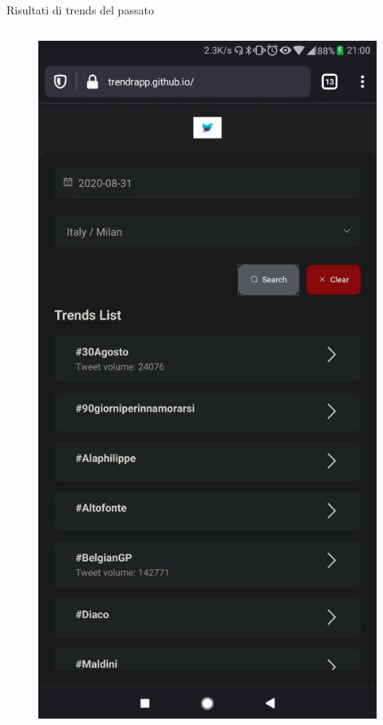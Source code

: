 \documentclass[xcolor=svgnames, aspectratio=169]{beamer}
\begin{document}
\begin{frame}{Risultati di trends del passato}
\begin{columns}[t]
\begin{figure}[H]
            \includegraphics[width=0.32\paperwidth,height=0.7\paperheight,keepaspectratio]{Mobile_Firefox_Ricerca_trends_a_Milano_31_agosto.jpg}
        \end{figure}
        \vspace*{-12pt}

\end{columns}
\end{frame}
\end{document}

